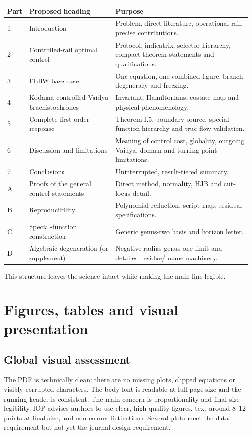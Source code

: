 \documentclass[11pt,a4paper]{article}
\begin{document}
\begin{longtable}{@{}p{}p{}p{}@{}}
\toprule
Part & Proposed heading & Purpose \\
\midrule
\endhead
1 & Introduction & Problem, direct literature, operational rail, precise contributions. \\
2 & Controlled-rail optimal control & Protocol, indicatrix, selector hierarchy, compact theorem
statements and qualifications. \\
3 & FLRW base case & One equation, one combined figure, branch degeneracy and freezing. \\
4 & Kodama-controlled Vaidya brachistochrones & Invariant, Hamiltonians, costate map and physical
phenomenology. \\
5 & Complete first-order response & Theorem I.5, boundary source, special-function hierarchy and
true-flow validation. \\
6 & Discussion and limitations & Meaning of control cost, globality, outgoing Vaidya, domain and
turning-point limitations. \\
7 & Conclusions & Uninterrupted, result-tiered summary. \\
A & Proofs of the general control statements & Direct method, normality, HJB and cut-locus detail. \\
B & Reproducibility & Polynomial reduction, script map, residual specifications. \\
C & Special-function construction & Generic genus-two basis and horizon letter. \\
D & Algebraic degeneration (or supplement) & Negative-radius genus-one limit and detailed residue/
nome machinery. \\
\bottomrule
\end{longtable}

This structure leaves the science intact while making the main line legible.

\section{Figures, tables and visual presentation}

\subsection{Global visual assessment}

The PDF is technically clean: there are no missing plots, clipped equations or visibly corrupted
characters.  The body font is readable at full-page size and the running header is consistent.
The main concern is proportionality and final-size legibility.  IOP advises authors to use clear,
high-quality figures, text around 8--12 points at final size, and non-colour distinctions.  Several
plots meet the data requirement but not yet the journal-design requirement.
\end{document}

